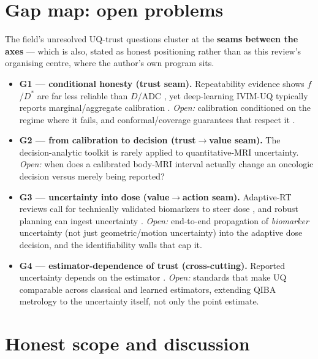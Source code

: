 \documentclass{iopjournal}
\newcommand{\Dstar}{D^{*}}
\begin{document}
\section{Gap map: open problems}
\label{sec:gaps}

The field's unresolved UQ-trust questions cluster at the \textbf{seams between the axes}
--- which is also, stated as honest positioning rather than as this review's organising
centre, where the author's own program sits.

\begin{itemize}
  \item \textbf{G1 --- conditional honesty (trust seam).} Repeatability evidence shows
    $f$/$\Dstar$ are far less reliable than $D$/ADC
    \cite{sun2017,yang2019,simchick2024}, yet deep-learning IVIM-UQ typically reports
    marginal/aggregate calibration \cite{casali2025}. \emph{Open:} calibration
    conditioned on the regime where it fails, and conformal/coverage guarantees that
    respect it \cite{angelopoulos2021,ovadia2019}.
  \item \textbf{G2 --- from calibration to decision (trust$\rightarrow$value seam).} The
    decision-analytic toolkit \cite{vickers2006,zhao2021} is rarely applied to
    quantitative-MRI uncertainty. \emph{Open:} when does a calibrated body-MRI interval
    actually change an oncologic decision versus merely being reported?
  \item \textbf{G3 --- uncertainty into dose (value$\rightarrow$action seam).}
    Adaptive-RT reviews call for technically validated biomarkers to steer dose
    \cite{otazo2021,vanhoudt2021qib}, and robust planning can ingest uncertainty
    \cite{unkelbach2018}. \emph{Open:} end-to-end propagation of \emph{biomarker}
    uncertainty (not just geometric/motion uncertainty) into the adaptive dose decision,
    and the identifiability walls that cap it.
  \item \textbf{G4 --- estimator-dependence of trust (cross-cutting).} Reported
    uncertainty depends on the estimator \cite{barbieri2016,barbieri2020}. \emph{Open:}
    standards that make UQ comparable across classical and learned estimators, extending
    QIBA metrology \cite{raunig2015,sullivan2015} to the uncertainty itself, not only the
    point estimate.
\end{itemize}

\section{Honest scope and discussion}
\label{sec:scope-honest}
\end{document}

